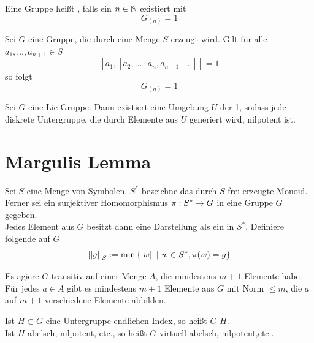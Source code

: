 \documentclass{book}
\begin{document}
\Def{}
Eine Gruppe heißt , falls ein $n \in \mathbb{N}$ existiert mit
\[ G_{(n)} = 1 \]

\Prop{}
Sei $G$ eine Gruppe, die durch eine Menge $S$ erzeugt wird. Gilt für alle $a_1,\ldots, a_{n+1} \in S$
\[ [a_1, [a_2,  \ldots [a_n, a_{n+1} ] \ldots ]] = 1 \]
so folgt
\[ G_{(n)} = 1 \]

\Lem{}
Sei $G$ eine Lie-Gruppe. Dann existiert eine Umgebung $U$ der 1, sodass jede diskrete Untergruppe, die durch Elemente aus $U$ generiert wird, nilpotent ist.

\section{Margulis Lemma}

\Def{}
Sei $S$ eine Menge von Symbolen. $S^*$ bezeichne das durch $S$ frei erzeugte Monoid. Ferner sei ein surjektiver Homomorphismus $\pi : S^* \overset{}{\rightarrow} G$ in eine Gruppe $G$ gegeben.\\
Jedes Element aus $G$ besitzt dann eine Darstellung als ein  in $S^*$. Definiere folgende  auf $G$
\[ \norm{g}_S := \min \set{\bet{w}}{w\in S^*, \pi(w) = g} \]

\Lem{}
Es agiere $G$ transitiv auf einer Menge $A$, die mindestens $m+1$ Elemente habe. Für jedes $a \in A$ gibt es mindestens $m+1$ Elemente aus $G$ mit Norm $\leq m$, die $a$ auf $m+1$ verschiedene Elemente abbilden.

\Def{}
Ist $H \subset G$ eine Untergruppe endlichen Index, so heißt $G$  $H$.\\
Ist $H$ abelsch, nilpotent, etc., so heißt $G$ virtuell abelsch, nilpotent,etc..
\end{document}
